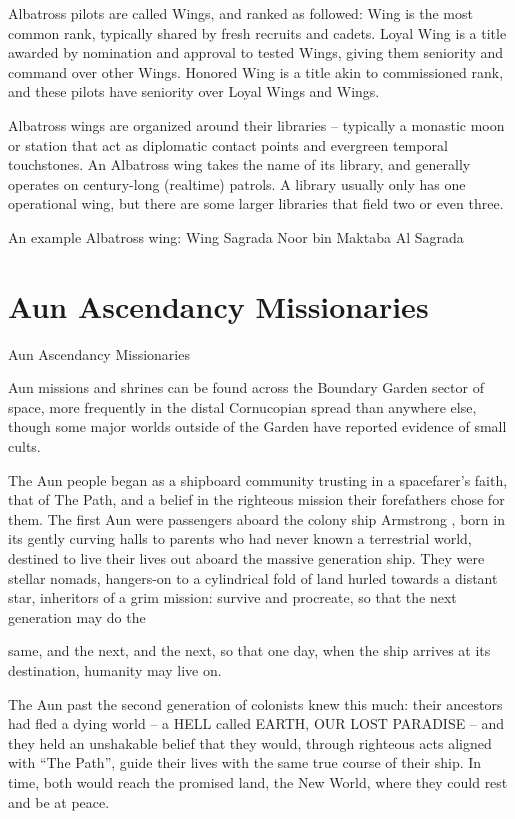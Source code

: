 Albatross pilots are called Wings, and ranked as followed: Wing is the most common rank,  
typically shared by fresh recruits and cadets. Loyal Wing is a title awarded by nomination and  
approval to tested Wings, giving them seniority and command over other Wings. Honored Wing  
is a title akin to commissioned rank, and these pilots have seniority over Loyal Wings and Wings. 
 

Albatross wings are organized around their libraries -- typically a monastic moon or station that  
act as diplomatic contact points and evergreen temporal touchstones. An Albatross wing takes  
the name of its library, and generally operates on century-long (realtime) patrols. A library usually  
only has one operational wing, but there are some larger libraries that field two or even three. 
 

An example Albatross wing: Wing Sagrada Noor bin Maktaba Al Sagrada 
 
\section{Aun Ascendancy Missionaries}
Aun Ascendancy Missionaries  

Aun missions and shrines can be found across the Boundary Garden sector of space, more  
frequently in the distal Cornucopian spread than anywhere else, though some major worlds  
outside of the Garden have reported evidence of small cults. 
 

The Aun people began as a shipboard community trusting in a spacefarer's faith, that of The  
Path, and a belief in the righteous mission their forefathers chose for them. The first Aun were  
passengers aboard the colony ship Armstrong , born in its gently curving halls to parents who  
had never known a terrestrial world, destined to live their lives out aboard the massive generation  
ship. They were stellar nomads, hangers-on to a cylindrical fold of land hurled towards a distant  
star, inheritors of a grim mission: survive and procreate, so that the next generation may do the  

                                                                                                         


same, and the next, and the next, so that one day, when the ship arrives at its destination,  
humanity may live on.
 

The Aun past the second generation of colonists knew this much: their ancestors had fled a  
dying world -- a HELL called EARTH, OUR LOST PARADISE -- and they held an unshakable  
belief that they would, through righteous acts aligned with “The Path”, guide their lives with the  
same true course of their ship. In time, both would reach the promised land, the New World,  
where they could rest and be at peace. 
 

